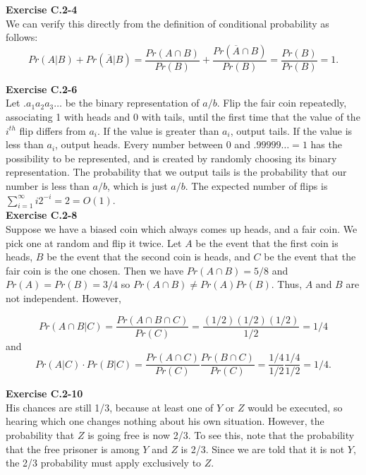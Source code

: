 \documentclass{article}
\begin{document}
\noindent\textbf{Exercise C.2-4}\\

We can verify this directly from the definition of conditional probability as follows:
\[Pr(A|B) + Pr(\overline{A} | B) = \frac{Pr(A \cap B)}{Pr(B)} + \frac{Pr(\overline{A} \cap B)}{Pr(B)} = \frac{Pr(B)}{Pr(B)} = 1.\]

\noindent\textbf{Exercise C.2-6}\\

Let $.a_1a_2a_3\ldots$ be the binary representation of $a/b$.  Flip the fair coin repeatedly, associating 1 with heads and 0 with tails, until the first time that the value of the $i^{th}$ flip differs from $a_i$.  If the value is greater than $a_i$, output tails.  If the value is less than $a_i$, output heads.  Every number between 0 and $.99999\ldots = 1$ has the possibility to be represented, and is created by randomly choosing its binary representation.  The probability that we output tails is the probability that our number is less than $a/b$, which is just $a/b$.  The expected number of flips is $\sum_{i=1}^\infty i2^{-i} = 2 = O(1)$. \\

\noindent\textbf{Exercise C.2-8}\\

Suppose we have a biased coin which always comes up heads, and a fair coin.  We pick one at random and flip it twice.  Let $A$ be the event that the first coin is heads, $B$ be the event that the second coin is heads, and $C$ be the event that the fair coin is the one chosen.  Then we have $Pr(A \cap B) = 5/8$ and $Pr(A) = Pr(B) = 3/4$ so $Pr(A \cap B) \neq Pr(A)Pr(B)$.  Thus, $A$ and $B$ are not independent.  However, 

\[ Pr(A \cap B | C) = \frac{Pr(A \cap B \cap C)}{Pr(C)} = \frac{(1/2)(1/2)(1/2)}{1/2} = 1/4\]
and
\[ Pr(A|C)\cdot Pr(B|C) = \frac{Pr(A \cap C)}{Pr(C)} \frac{Pr(B \cap C)}{Pr(C)} = \frac{1/4}{1/2} \frac{1/4}{1/2} = 1/4.\]

\noindent\textbf{Exercise C.2-10}\\

His chances are still 1/3, because at least one of $Y$ or $Z$ would be executed, so hearing which one changes nothing about his own situation.  However, the probability that $Z$ is going free is now 2/3.  To see this, note that the probability that the free prisoner is among $Y$ and $Z$ is 2/3.  Since we are told that it is not $Y$, the 2/3 probability must apply exclusively to $Z$.  \\
\end{document}
